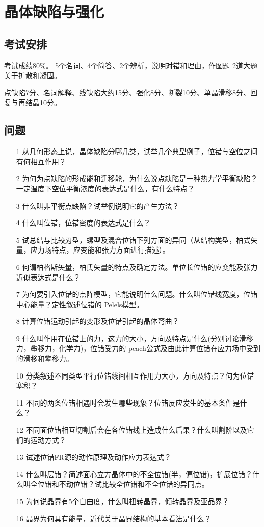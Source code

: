 \chapter{晶体缺陷与强化}
    \section{考试安排}
        考试成绩80\%。
        5个名词、4个简答、2个辨析，说明对错和理由，作图题
        2道大题关于扩散和凝固。

        点缺陷7分、名词解释、线缺陷大约15分、强化8分、断裂10分、单晶滑移8分、回复与再结晶10分。
    \section{问题}
    \begin{itemize}
        \item[1] 从几何形态上说，晶体缺陷分哪几类，试举几个典型例子，位错与空位之间有何相互作用？
        \item[2] 为何为点缺陷的形成能和迁移能，为什么说点缺陷是一种热力学平衡缺陷？一定温度下空位平衡浓度的表达式是什么，有什么特点？
        \item[3] 什么叫非平衡点缺陷？试举例说明它的产生方法？
        \item[4] 什么叫位错，位错密度的表达式是什么？
        \item[5] 试总结与比较刃型，螺型及混合位错下列方面的异同（从结构类型，柏式矢量，应力场特点，应变能和张力方面进行描述）。
        \item[6] 何谓柏格斯矢量，柏氏矢量的特点及确定方法。单位长位错的应变能及张力近似表达式是什么？
        \item[7] 为何要引入位错的点阵模型，它能说明什么问题。什么叫位错线宽度，位错中心能量？定性叙述位错的 Pelels模型。
        \item[8] 计算位错运动引起的变形及位错引起的晶体弯曲？
        \item[9] 什么叫作用在位错上的力，这力的大小，方向及特点是什么(分别讨论滑移力，攀移力，化学力)，位错受力的 peach公式及由此计算位错在应力场中受到的滑移和攀移力。 
        \item[10] 分类叙述不同类型平行位错线间相互作用力大小，方向及特点？何为位错塞积？
        \item[11] 不同的两条位错相遇时会发生哪些现象？位错反应发生的基本条件是什么？
        \item[12] 不同面位错相互切割后会在各位错线上造成什么后果？什么叫割阶以及它们的运动方式？
        \item[13] 试述位错FR源的动作原理及动作应力表达式？
        \item[14] 什么叫层错？简述面心立方晶体中的不全位错(半，偏位错)，扩展位错？什么叫全位错和不动位错？试比较全位错和不全位错的异同点。
        \item[15] 为何说晶界有5个自由度，什么叫扭转晶界，倾转晶界及亚品界？
        \item[16] 晶界为何具有能量，近代关于晶界结构的基本看法是什么？
    \end{itemize}
